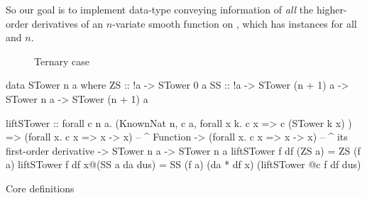 \documentclass[./rims-smooth-paper.tex]{subfiles}
\begin{document}
So our goal is to implement  data-type conveying information of \emph{all} the higher-order derivatives of an $n$-variate smooth function on , which has  instances for all  and $n$.

\begin{figure}[htbp]
  \centering
  \caption{Ternary case\label{fig:tree}}
\end{figure}

\begin{listing}[tbp]
\begin{code}
data STower n a where
  ZS :: !a -> STower 0 a
  SS :: !a -> STower (n + 1) a -> STower n a -> STower (n + 1) a

liftSTower
  :: forall c n a. (KnownNat n, c a, forall x k. c x => c (STower k x) )
  => (forall x. c x => x -> x)
      -- ^ Function
  -> (forall x. c x => x -> x)
      -- ^ its first-order derivative
  -> STower n a
  -> STower n a
liftSTower f df (ZS a) = ZS (f a)
liftSTower f df x@(SS a da dus)
  = SS (f a) (da * df x) 
       (liftSTower @c f df dus)
\end{code}
\caption{Core definitions\label{lst:data-def}}
\end{listing}
\end{document}

